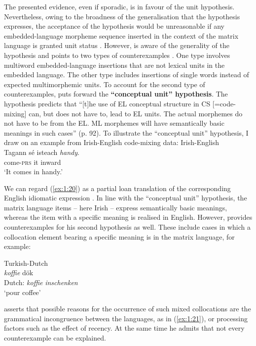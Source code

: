 The presented evidence, even if sporadic, is in favour of the unit hypothesis. Nevertheless, owing to the broadness of the generalisation that the hypothesis expresses, the acceptance of the hypothesis would be unreasonable if any embedded-language morpheme sequence inserted in the context of the matrix language is granted unit status \citep[cf.][42]{wray-2002}. However, \citet[91]{backus-units-2003} is aware of the generality of the hypothesis and points to two types of counterexamples \citep[also see][105--107]{backus-evidence-1999}. One type involves multiword embedded-language insertions that are not lexical units in the embedded language. The other type includes insertions of single words instead of expected multimorphemic units. To account for the second type of counterexamples, \citet{backus-units-2003} puts forward the \textbf{``conceptual unit'' hypothesis}. The hypothesis predicts that ``[t]he use of EL conceptual structure in CS [=code-mixing] can, but does not have to, lead to EL units. The actual morphemes do not have to be from the EL. ML morphemes will have semantically basic meanings in such cases'' (p. 92). To illustrate the ``conceptual unit'' hypothesis, I draw on an example from Irish-English code-mixing data:
\ea
\label{ex:1:20}
Irish-English \citep[184]{stenson-1990}\\
\gll Tagann sé isteach \textit{handy}.\\
come-{\textsc{prs}} it inward {}\\
\glt `It comes in handy.'
\z

\noindent We can regard (\ref{ex:1:20}) as a partial loan translation of the corresponding English idiomatic expression \citep[184]{stenson-1990}. In line with the ``conceptual unit'' hypothesis, the matrix language items -- here Irish -- express semantically basic meanings, whereas the item with a specific meaning is realised in English. However, \citeauthor[]{backus-units-2003} provides counterexamples for his second hypothesis as well. These include cases in which a collocation element bearing a specific meaning is in the matrix language, for example:

\ea{}\label{ex:1:21}
Turkish-Dutch \citep[111]{backus-units-2003}\\
\gll {} \textit{koffie} dök\\
Dutch: \textit{koffie} \textit{inschenken}\\
 \hspace{7.5mm} `pour coffee'
\z

\noindent \citet[113]{backus-units-2003} asserts that possible reasons for the occurrence of such mixed collocations are the grammatical incongruence between the languages, as in (\ref{ex:1:21}), or processing factors such as the effect of recency. At the same time he admits that not every counterexample can be explained.

